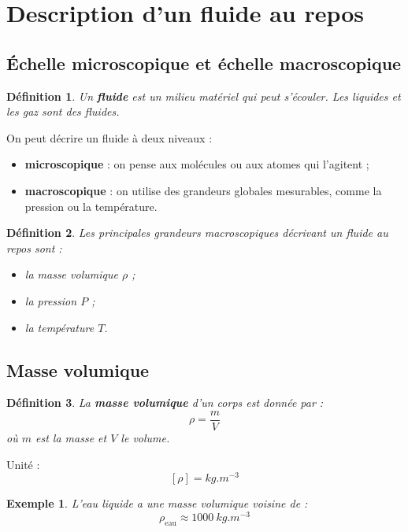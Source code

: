 \documentclass[11pt,a4paper]{article}
\newtheorem{definition}{Définition}[section]
\newtheorem{exemple}{Exemple}[section]
\begin{document}
\section{Description d'un fluide au repos}

\subsection{Échelle microscopique et échelle macroscopique}

\begin{definition}
Un \textbf{fluide} est un milieu matériel qui peut s'écouler. Les liquides et les gaz sont des fluides.
\end{definition}

On peut décrire un fluide à deux niveaux :

\begin{itemize}
    \item \textbf{microscopique} : on pense aux molécules ou aux atomes qui l'agitent ;
    \item \textbf{macroscopique} : on utilise des grandeurs globales mesurables, comme la pression ou la température.
\end{itemize}

\begin{definition}
Les principales grandeurs macroscopiques décrivant un fluide au repos sont :
\begin{itemize}
    \item la masse volumique $\rho$ ;
    \item la pression $P$ ;
    \item la température $T$.
\end{itemize}
\end{definition}

\subsection{Masse volumique}

\begin{definition}
La \textbf{masse volumique} d'un corps est donnée par :
\[
\rho = \frac{m}{V}
\]
où $m$ est la masse et $V$ le volume.
\end{definition}

Unité :
\[
[\rho]=\si{kg.m^{-3}}
\]

\begin{exemple}
L'eau liquide a une masse volumique voisine de :
\[
\rho_{\text{eau}} \approx \SI{1000}{kg.m^{-3}}
\]
\end{exemple}
\end{document}
